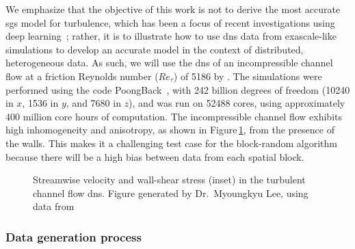 \documentclass[review]{elsarticle}
\begin{document}
We emphasize that the objective of this work is not to derive the most
accurate \gls{sgs} model for turbulence, which has been a focus of
recent investigations using deep learning~\cite{Ling2016, Maulik2017};
rather, it is to illustrate how to use \gls{dns} data from exascale-like
simulations to develop an accurate model in the context of
distributed, heterogeneous data. As such, we will use the \gls{dns} of
an incompressible channel flow at a friction Reynolds number ($Re_\tau$) of 5186
by \citet{lee2015direct}. The simulations were performed using the code
PoongBack~\cite{lee2013petascale,lee2014experiences}, with 242 billion degrees
of freedom (10240 in $x$, 1536 in $y$, and 7680 in $z$), and was run on 52488 cores,
using approximately 400 million core hours of computation. The incompressible
channel flow exhibits high inhomogeneity and anisotropy, as shown in
Figure\,\ref{fig:dns_channel}, from the presence of the walls.  This makes it a
challenging test case for the block-random algorithm because there will be a high
bias between data from each spatial block.

\begin{figure}[!tbp]%
  \centering%
  \caption{Streamwise velocity and wall-shear stress (inset) in the turbulent channel flow \gls{dns}. Figure generated by Dr.~Myoungkyu Lee, using data from~\cite{lee2015direct}}%
  \label{fig:dns_channel}%
\end{figure}%

\subsubsection{Data generation process}
\end{document}
